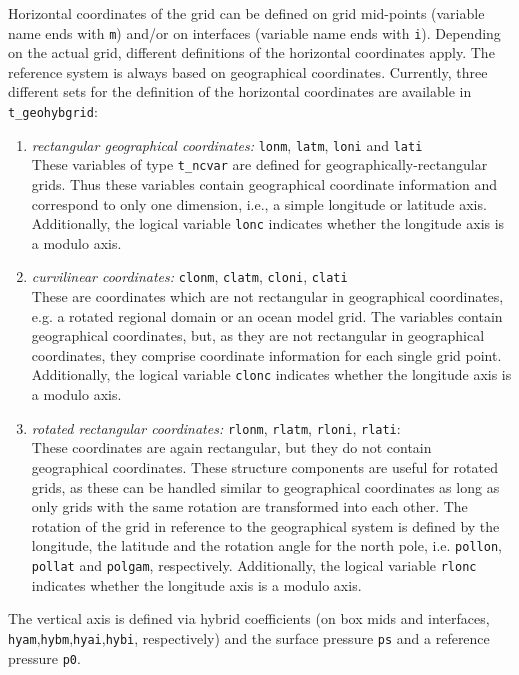 \documentclass[11pt,twoside]{article}
\begin{document}
Horizontal coordinates of the grid can be defined on grid mid-points (variable
name  ends with \verb|m|) and/or on interfaces (variable
name  ends with \verb|i|). Depending on the actual grid, different definitions
of the horizontal coordinates apply. The reference system is always 
based on geographical coordinates. Currently, three different sets for
the definition of  the horizontal coordinates are available
in \verb|t_geohybgrid|: 
\begin{enumerate}
\item {\it rectangular geographical coordinates:} \verb|lonm|, 
\verb|latm|, \verb|loni| and \verb|lati|\\
These variables of type \verb|t_ncvar| are defined for
geographically-rectangular grids. Thus these variables contain
geographical coordinate 
information and correspond to only one dimension, i.e.,
a simple longitude or latitude axis. Additionally, the logical variable 
\verb|lonc| indicates whether the longitude axis is a modulo axis.
\item {\it curvilinear coordinates:} \verb|clonm|, \verb|clatm|, 
\verb|cloni|, \verb|clati|\\
These are coordinates which are not rectangular in geographical coordinates,
e.g. a rotated regional domain or an ocean model grid. The variables contain
 geographical coordinates, but, as they are not rectangular in 
geographical coordinates,  they comprise coordinate information for each single
grid point. Additionally, the logical variable 
\verb|clonc| indicates whether the longitude axis is a modulo axis.

\item {\it rotated rectangular coordinates:} \verb|rlonm|,
 \verb|rlatm|, \verb|rloni|, \verb|rlati|:\\
These coordinates are again rectangular, but they do not contain geographical
coordinates. These structure components are useful for rotated grids,
as these can be
handled similar to geographical coordinates as long as only grids with the
same rotation are transformed into each other. The rotation of the grid in
reference to the geographical system is defined by the longitude, the latitude
 and the rotation angle for the north pole, i.e. \verb|pollon|, 
    \verb|pollat| and \verb|polgam|, respectively.
Additionally, the logical variable \verb|rlonc| indicates whether the 
longitude axis is a modulo axis.
\end{enumerate}

The vertical axis is defined via hybrid coefficients (on box mids and 
interfaces, \verb|hyam|,\verb|hybm|,\verb|hyai|,\verb|hybi|, respectively)
and the surface pressure \verb|ps| and a reference pressure \verb|p0|. 
\end{document}
